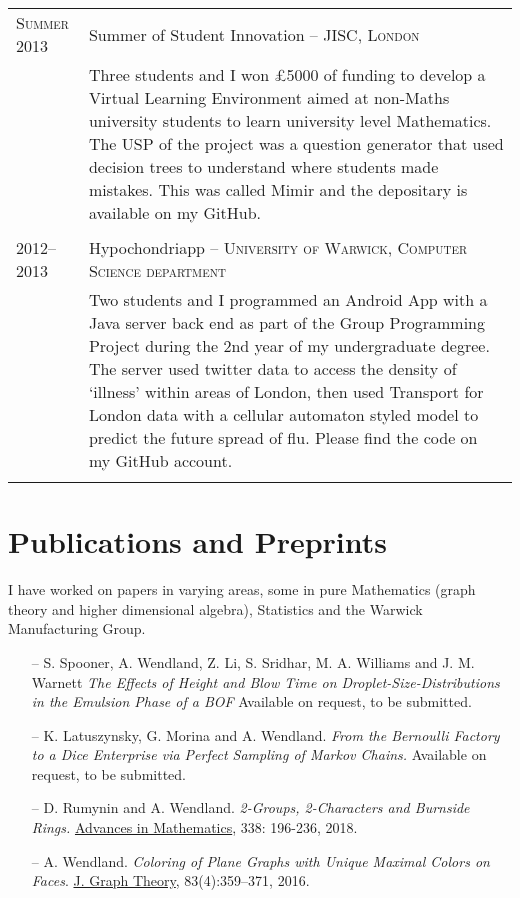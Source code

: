 \documentclass[a4paper,10pt]{article}
\begin{document}
\begin{tabular}{p{2.25cm}|p{15cm}}
	\textsc{Summer 2013} & Summer of Student Innovation -- \textsc{JISC, London} \\&\footnotesize{Three students and I won £5000 of funding to develop a Virtual Learning Environment aimed at non-Maths university students to learn university level Mathematics. The USP of the project was a question generator that used decision trees to understand where students made mistakes. This was called Mimir and the depositary is available on my GitHub.}\\\multicolumn{2}{c}{} \\
	\textsc{2012--2013} & Hypochondriapp -- \textsc{University of Warwick, Computer Science department} \\&\footnotesize{Two students and I programmed an Android App with a Java server back end as part of the Group Programming Project during the 2nd year of my undergraduate degree. The server used twitter data to access the density of `illness' within areas of London, then used Transport for London data with a cellular automaton styled model to predict the future spread of flu. Please find the code on my GitHub account.}\\\multicolumn{2}{c}{} \\
\end{tabular}

\section{Publications and Preprints}
\footnotesize{I have worked on papers in varying areas, some in pure Mathematics (graph theory and higher dimensional algebra), Statistics and the Warwick Manufacturing Group.} 
\begin{itemize}
	\item[--] 
	S. Spooner, A. Wendland, Z. Li, S. Sridhar, M. A. Williams and J. M. Warnett \emph{The Effects of Height and Blow Time on Droplet-Size-Distributions in the Emulsion Phase of a BOF} Available on request, to be submitted.
	\item[--] 
	K. Latuszynsky, G. Morina and A. Wendland. \emph{From the Bernoulli Factory to a Dice Enterprise via Perfect Sampling of Markov Chains.} Available on request, to be submitted.
	\item[--]
	D. Rumynin and A. Wendland. \emph{2-Groups, 2-Characters and Burnside Rings.} \href{https://www.sciencedirect.com/science/article/pii/S0001870818303347}{Advances in Mathematics}, 338: 196-236, 2018.
	\item[--]
	A. Wendland. \emph{Coloring of Plane Graphs with Unique Maximal Colors on Faces}. \href{http://onlinelibrary.wiley.com/doi/10.1002/jgt.22002/abstract}{J. Graph Theory}, 83(4):359–371, 2016.
\end{itemize}
\end{document}
